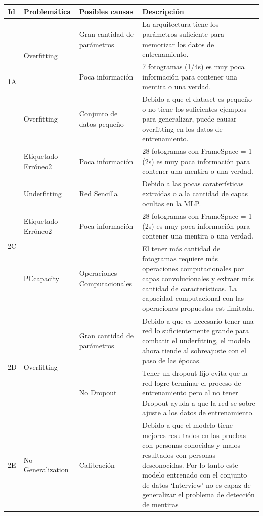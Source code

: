 \begin{onehalfspacing}
\begin{table}[h!]
\centering
    \begin{tabular}{|p{1cm}|p{3cm}|p{3cm}|p{7cm}|}
    \hline 
    Id & Problemática & Posibles causas & Descripción\tabularnewline
    \hline 
    \hline 
    \multirow{3}{*}{1A} & \multirow{2}{*}{Overfitting} & Gran cantidad de parámetros & La arquitectura tiene los parámetros suficiente para memorizar los
    datos de entrenamiento.\tabularnewline
    \cline{2-4} \cline{3-4} \cline{4-4} 
     & Etiquetado Erróneo & Poca información & 7 fotogramas (1/4s) es muy poca información para contener una mentira
    o una verdad.\tabularnewline
    \hline 
    \multirow{2}{*}{1B} & Overfitting & Conjunto de datos pequeño & Debido a que el dataset es pequeño o no tiene los suficientes ejemplos
    para generalizar, puede causar overfitting en los datos de entrenamiento.\tabularnewline
    \cline{2-4} \cline{3-4} \cline{4-4} 
     & Etiquetado Erróneo2 & Poca información & 28 fotogramas con FrameSpace = 1 (2s) es muy poca información para contener
    una mentira o una verdad.\tabularnewline
    \hline 
    \multirow{3}{*}{2C} & Underfitting & Red Sencilla & Debido a las pocas caraterísticas extraídas o a la cantidad de capas
    ocultas en la MLP.\tabularnewline
    \cline{2-4} \cline{3-4} \cline{4-4} 
     & Etiquetado Erróneo2 & Poca información & 28 fotogramas con FrameSpace = 1 (2s) es muy poca información para contener
    una mentira o una verdad.\tabularnewline
    \cline{2-4} \cline{3-4} \cline{4-4} 
     & PCcapacity & Operaciones Computacionales & El tener más cantidad de fotogramas requiere más operaciones computacionales
    por capas convolucionales y extraer más cantidad de características.
    La capacidad computacional con las operaciones propuestas est limitada.\tabularnewline
    \hline 
    \multirow{2}{*}{2D} & \multirow{2}{*}{Overfitting} & Gran cantidad de parámetros & Debido a que es necesario tener una red lo suficientemente grande
    para combatir el underfitting, el modelo ahora tiende al sobreajuste
    con el paso de las épocas.\tabularnewline
    \cline{3-4} \cline{4-4} 
     &  & No Dropout & Tener un dropout fijo evita que la red logre terminar el proceso de
    entrenamiento pero al no tener Dropout ayuda a que la red se sobre
    ajuste a los datos de entrenamiento.\tabularnewline
    \hline 
    2E & No Generalization & Calibración & Debido a que el modelo tiene mejores resultados en las pruebas con
    personas conocidas y malos resultados con personas desconocidas. Por
    lo tanto este modelo entrenado con el conjunto de datos `Interview' no es capaz
    de generalizar el problema de detección de mentiras\tabularnewline
    \hline 
    \end{tabular}


\end{table}
\end{onehalfspacing}

